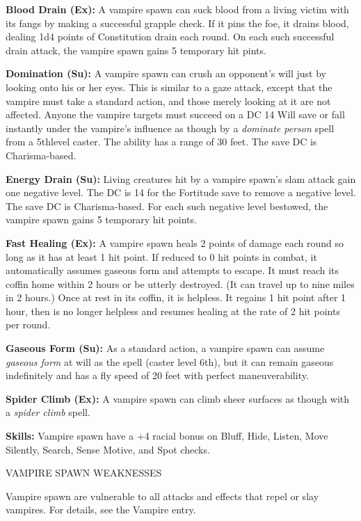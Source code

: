 \documentclass{article}
\begin{document}
\textbf{Blood Drain (Ex):} A vampire spawn can suck blood from a living victim 
with its fangs by making a successful grapple check. If it pins the foe, it drains 
blood, dealing 1d4 points of Constitution drain each round. On each such successful 
drain attack, the vampire spawn gains 5 temporary hit pints.

\textbf{Domination (Su):} A vampire spawn can crush an opponent's will just by 
looking onto his or her eyes. This is similar to a gaze attack, except that the 
vampire must take a standard action, and those merely looking at it are not affected. 
Anyone the vampire targets must succeed on a DC 14 Will save or fall instantly 
under the vampire's influence as though by a \textit{dominate person }spell from 
a 5thlevel caster. The ability has a range of 30 feet. The save DC is Charisma-based.

\textbf{Energy Drain (Su):} Living creatures hit by a vampire spawn's slam attack 
gain one negative level. The DC is 14 for the Fortitude save to remove a negative 
level. The save DC is Charisma-based. For each such negative level bestowed, the 
vampire spawn gains 5 temporary hit points.

\textbf{Fast Healing (Ex):} A vampire spawn heals 2 points of damage each round 
so long as it has at least 1 hit point. If reduced to 0 hit points in combat, it 
automatically assumes gaseous form and attempts to escape. It must reach its coffin 
home within 2 hours or be utterly destroyed. (It can travel up to nine miles in 
2 hours.) Once at rest in its coffin, it is helpless. It regains 1 hit point after 
1 hour, then is no longer helpless and resumes healing at the rate of 2 hit points 
per round.

\textbf{Gaseous Form (Su):} As a standard action, a vampire spawn can assume \textit{gaseous 
form }at will as the spell (caster level 6th), but it can remain gaseous indefinitely 
and has a fly speed of 20 feet with perfect maneuverability.

\textbf{Spider Climb (Ex): }A vampire spawn can climb sheer surfaces as though 
with a \textit{spider climb }spell.

\textbf{Skills:} Vampire spawn have a +4 racial bonus on Bluff, Hide, Listen, Move 
Silently, Search, Sense Motive, and Spot checks.

VAMPIRE SPAWN WEAKNESSES

Vampire spawn are vulnerable to all attacks and effects that repel or slay vampires. 
For details, see the Vampire entry.
\end{document}
